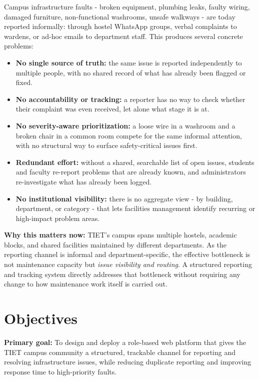 \documentclass[11pt,a4paper]{article}
\begin{document}
Campus infrastructure faults - broken equipment, plumbing leaks, faulty
wiring, damaged furniture, non-functional washrooms, unsafe walkways - are
today reported informally: through hostel WhatsApp groups, verbal
complaints to wardens, or ad-hoc emails to department staff. This produces
several concrete problems:

\begin{itemize}[leftmargin=0.7cm]
  \item \textbf{No single source of truth:} the same issue is reported
    independently to multiple people, with no shared record of what has
    already been flagged or fixed.
  \item \textbf{No accountability or tracking:} a reporter has no way to
    check whether their complaint was even received, let alone what stage
    it is at.
  \item \textbf{No severity-aware prioritization:} a loose wire in a
    washroom and a broken chair in a common room compete for the same
    informal attention, with no structural way to surface safety-critical
    issues first.
  \item \textbf{Redundant effort:} without a shared, searchable list of
    open issues, students and faculty re-report problems that are already
    known, and administrators re-investigate what has already been
    logged.
  \item \textbf{No institutional visibility:} there is no aggregate view
    - by building, department, or category - that lets facilities
    management identify recurring or high-impact problem areas.
\end{itemize}

\noindent\textbf{Why this matters now:} TIET's campus spans multiple hostels,
academic blocks, and shared facilities maintained by different
departments. As the reporting channel is informal and department-specific,
the effective bottleneck is not maintenance capacity but \emph{issue
visibility and routing}. A structured reporting and tracking system
directly addresses that bottleneck without requiring any change to how
maintenance work itself is carried out.



\section{Objectives}

\textbf{Primary goal:} To design and deploy a role-based web platform
that gives the TIET campus community a structured, trackable channel for
reporting and resolving infrastructure issues, while reducing duplicate
reporting and improving response time to high-priority faults.
\end{document}
